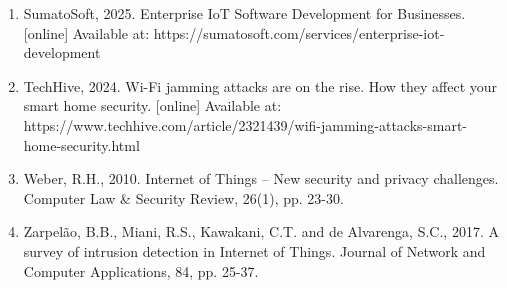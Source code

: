 \begin{enumerate}
  \item SumatoSoft, 2025. Enterprise IoT Software Development for Businesses. [online] Available at: https://sumatosoft.com/services/enterprise-iot-development
  \item TechHive, 2024. Wi-Fi jamming attacks are on the rise. How they affect your smart home security. [online] Available at: https://www.techhive.com/article/2321439/wifi-jamming-attacks-smart-home-security.html
  \item Weber, R.H., 2010. Internet of Things -- New security and privacy challenges. Computer Law \& Security Review, 26(1), pp. 23-30.
  \item Zarpelão, B.B., Miani, R.S., Kawakani, C.T. and de Alvarenga, S.C., 2017. A survey of intrusion detection in Internet of Things. Journal of Network and Computer Applications, 84, pp. 25-37.
\end{enumerate}
